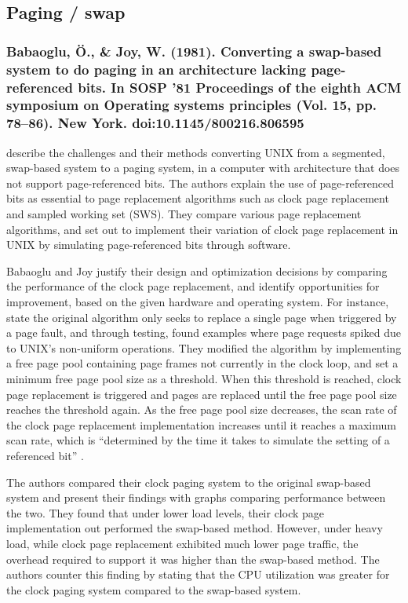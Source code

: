 \newpage

\subsection{Paging / swap}

\subsubsection*{Babaoglu, Ö., \& Joy, W. (1981). Converting a swap-based system to do paging in an architecture lacking page-referenced bits. In SOSP ’81 Proceedings of the eighth ACM symposium on Operating systems principles (Vol. 15, pp. 78–86). New York. doi:10.1145/800216.806595}

\citet{Babaoglu1981} describe the challenges and their methods converting UNIX from a segmented, swap-based system to a paging system, in a computer with architecture that does not support page-referenced bits. The authors explain the use of page-referenced bits as essential to page replacement algorithms such as clock page replacement and sampled working set (SWS). They compare various page replacement algorithms, and set out to implement their variation of clock page replacement in UNIX by simulating page-referenced bits through software.

Babaoglu and Joy justify their design and optimization decisions by comparing the performance of the clock page replacement, and identify opportunities for improvement, based on the given hardware and operating system. For instance, \citet[p. 80]{Babaoglu1981} state the original algorithm only seeks to replace a single page when triggered by a page fault, and through testing, found examples where page requests spiked due to UNIX's non-uniform operations. They modified the algorithm by implementing a free page pool containing page frames not currently in the clock loop, and set a minimum free page pool size as a threshold. When this threshold is reached, clock page replacement is triggered and pages are replaced until the free page pool size reaches the threshold again. As the free page pool size decreases, the scan rate of the clock page replacement implementation increases until it reaches a maximum scan rate, which is ``determined by the time it takes to simulate the setting of a referenced bit'' \citep[p. 80]{Babaoglu1981}.

The authors compared their clock paging system to the original swap-based system and present their findings with graphs comparing performance between the two. They found that under lower load levels, their clock page implementation out performed the swap-based method. However, under heavy load, while clock page replacement exhibited much lower page traffic, the overhead required to support it was higher than the swap-based method. The authors counter this finding by stating that the CPU utilization was greater for the clock paging system compared to the swap-based system.

